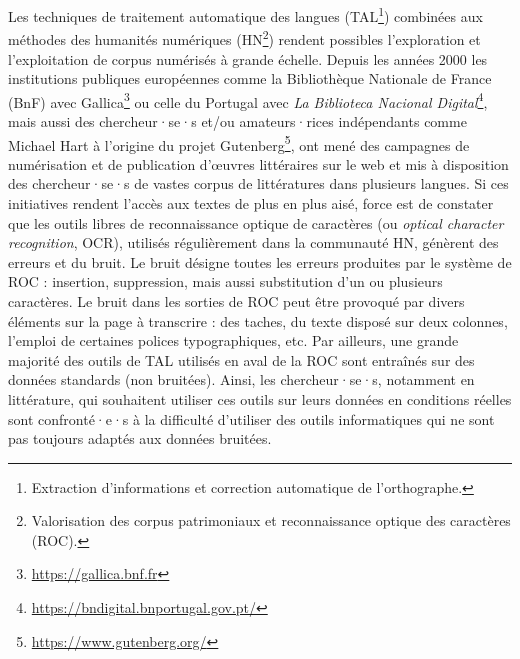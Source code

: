 Les techniques de traitement automatique des langues (TAL\footnote{Extraction d'informations et correction automatique de l'orthographe.}) combinées aux méthodes des humanités numériques (HN\footnote{Valorisation des corpus patrimoniaux et reconnaissance optique des caractères (ROC).}) rendent possibles l'exploration et l'exploitation de corpus numérisés à grande échelle.
Depuis les années 2000 les institutions publiques européennes comme la Bibliothèque Nationale de France (BnF) avec Gallica\footnote{\url{https://gallica.bnf.fr}} ou celle du Portugal avec \textit{La Biblioteca Nacional Digital}\footnote{\url{https://bndigital.bnportugal.gov.pt/}}, mais aussi des chercheur·se·s et/ou amateurs·rices indépendants comme Michael Hart à l'origine du projet Gutenberg\footnote{\url{https://www.gutenberg.org/}}, ont mené des campagnes de numérisation et de publication d’œuvres littéraires sur le web et mis à disposition des chercheur·se·s de vastes corpus de littératures dans plusieurs langues. Si ces initiatives rendent l'accès aux textes de plus en plus aisé, force est de constater que les outils libres de reconnaissance optique de caractères (ou \textit{optical character recognition}, OCR), utilisés régulièrement dans la communauté HN, génèrent des erreurs et du bruit. Le bruit désigne toutes les erreurs produites par le système de ROC : insertion, suppression, mais aussi substitution d'un ou plusieurs caractères. Le bruit dans les sorties de ROC peut être provoqué par divers éléments sur la page à transcrire : des taches, du texte disposé sur deux colonnes, l'emploi de certaines polices typographiques, etc.
Par ailleurs, une grande majorité des outils de TAL utilisés en aval de la ROC sont entraînés sur des données standards (non bruitées). Ainsi, les chercheur·se·s, notamment en littérature, qui souhaitent utiliser ces outils sur leurs données en conditions réelles sont confronté·e·s à la difficulté d'utiliser des outils informatiques qui ne sont pas toujours adaptés aux données bruitées. 

